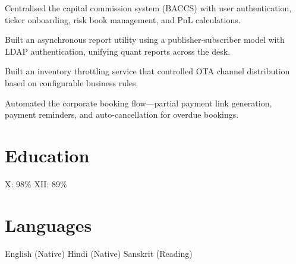\documentclass[]{deedy-resume-openfont}
\begin{document}
\begin{tightemize}
    \item Centralised the capital commission system (BACCS) with user authentication, ticker onboarding, risk book management, and PnL calculations.
    \item Built an asynchronous report utility using a publisher-subscriber model with LDAP authentication, unifying quant reports across the desk.
\end{tightemize}
\sectionsep

\vspace{\topsep}
\begin{tightemize}
    \item Built an inventory throttling service that controlled OTA channel distribution based on configurable business rules.
    \item Automated the corporate booking flow—partial payment link generation, payment reminders, and auto-cancellation for overdue bookings.
\end{tightemize}
\sectionsep


\section{Education}
\sectionsep

X: 98\% \textbullet{} XII: 89\%
\sectionsep


\section{Languages}
 English (Native) \textbullet{} Hindi (Native) \textbullet{} Sanskrit (Reading)
\sectionsep
\end{document}

